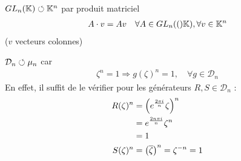 \documentclass[french,a4paper,10pt]{article}
\begin{document}
	\begin{myexample}
		$GL_n(\mathbb{K})\circlearrowleft\mathbb{K}^n$ par produit matriciel
		\[\begin{aligned}
			A\cdot v=Av\quad\forall A\in GL_n(()\mathbb{K}),\forall v\in \mathbb{K}^n
		\end{aligned}\]
		($v$ vecteurs colonnes)
	\end{myexample}
	
	\begin{myexample}
		$\mathcal D_n\circlearrowleft\mu_n$ car
		\[\begin{aligned}
			\zeta^n=1\Rightarrow g(\zeta)^n=1,\quad\forall g\in\mathcal D_n
		\end{aligned}\]
		En effet, il suffit de le vérifier pour les générateurs $R, S\in \mathcal D_n$ :
		\[\begin{aligned}
			R(\zeta)^n&=\left(e^{\frac{2\pi i}n}\zeta\right)^n\\
			&=e^{\frac{2n\pi i}n}\zeta^n\\&=1\\
			S(\zeta)^n&=\left(\overline{\zeta}\right)^n=\zeta^{-n}=1
		\end{aligned}\]
	\end{myexample}
	
\end{document}

